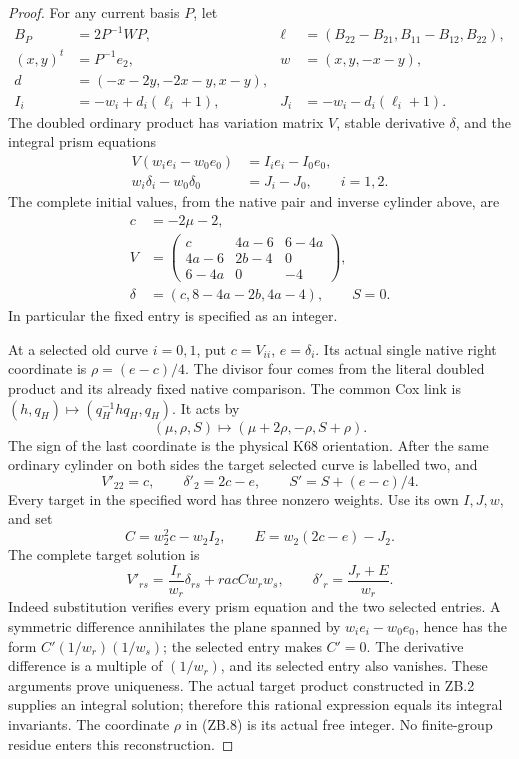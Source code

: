 \begin{proof}
For any current basis \(P\), let
\[
\begin{aligned}
B_P&=2P^{-1}WP,&
\ell&=(B_{22}-B_{21},B_{11}-B_{12},B_{22}),\\
(x,y)^t&=P^{-1}e_2,& w&=(x,y,-x-y),\\
d&=(-x-2y,-2x-y,x-y),\\
I_i&=-w_i+d_i(\ell_i+1),&
J_i&=-w_i-d_i(\ell_i+1).
\end{aligned}                                           \tag{ZB.5}
\]
The doubled ordinary product has variation matrix \(V\), stable
derivative \(\delta\), and the integral prism equations
\[
\begin{aligned}
V(w_i e_i-w_0e_0)&=I_ie_i-I_0e_0,\\
w_i\delta_i-w_0\delta_0&=J_i-J_0,\qquad i=1,2.
\end{aligned}                                           \tag{ZB.6}
\]
The complete initial values, from the native pair and inverse cylinder
above, are
\[
\begin{aligned}
c&=-2\mu-2,\\
V&=\begin{pmatrix}
c&4a-6&6-4a\\4a-6&2b-4&0\\6-4a&0&-4
\end{pmatrix},\\
\delta&=(c,8-4a-2b,4a-4),\qquad S=0.
\end{aligned}                                           \tag{ZB.7}
\]
In particular the fixed entry is specified as an integer.

At a selected old curve \(i=0,1\), put
\(c=V_{ii}\), \(e=\delta_i\). Its actual single native right
coordinate is \(\rho=(e-c)/4\). The divisor four comes from
the literal doubled product and its already fixed native comparison.
The common Cox link is
\((h,q_H)\mapsto(q_H^{-1}hq_H,q_H)\). It acts by
\[
(\mu,\rho,S)\longmapsto(\mu+2\rho,-\rho,S+\rho).
                                                               \tag{ZB.8}
\]
The sign of the last coordinate is the physical K68 orientation.
After the same ordinary cylinder on both sides the target selected
curve is labelled two, and
\[
V'_{22}=c,\qquad\delta'_2=2c-e,\qquad S'=S+(e-c)/4.
                                                               \tag{ZB.9}
\]
Every target in the specified word has three nonzero weights. Use its
own \(I,J,w\), and set
\[
C=w_2^2c-w_2I_2,\qquad E=w_2(2c-e)-J_2.
\]
The complete target solution is
\[
V'_{rs}=\frac{I_r}{w_r}\delta_{rs}+rac{C}{w_rw_s},
\qquad\delta'_r=\frac{J_r+E}{w_r}.                       \tag{ZB.10}
\]
Indeed substitution verifies every prism equation and the two selected
entries. A symmetric difference annihilates the plane spanned by
\(w_i e_i-w_0e_0\), hence has the form
\(C'(1/w_r)(1/w_s)\); the selected entry makes \(C'=0\).
The derivative difference is a multiple of \((1/w_r)\), and its
selected entry also vanishes. These arguments prove uniqueness. The
actual target product constructed in ZB.2 supplies an integral
solution; therefore this rational expression equals its integral
invariants. The coordinate \(\rho\) in (ZB.8) is its actual free
integer. No finite-group residue enters this reconstruction.


\end{proof}
